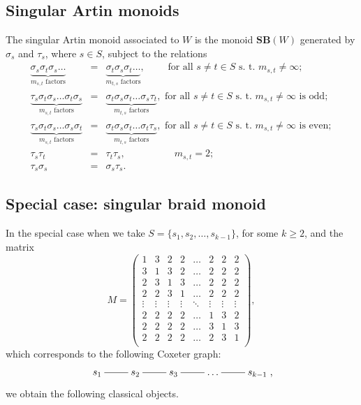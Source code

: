 \documentclass[a4paper]{amsart}
\begin{document}
\subsection{Singular Artin monoids}\label{s2.4}

The singular Artin monoid associated to $W$ is the
monoid $\mathbf{SB}(W)$ generated by $\sigma_s$ and $\tau_s$, where $s\in S$,  
subject to the relations
\begin{eqnarray}\label{sbm-eq1}
\underbrace{\sigma_s\sigma_t\sigma_s\dots}_{m_{s,t}\text{ factors}}
&=&\underbrace{\sigma_t\sigma_s\sigma_t\dots}_{m_{t,s}\text{ factors}},\qquad
\text{ for all }s\neq t\in S\text{ s. t. }m_{s,t}\neq \infty;\\
\label{sbm-eq2}
\underbrace{\tau_s\sigma_t\sigma_s\dots \sigma_t\sigma_s}_{m_{s,t}\text{ factors}}
&=&\underbrace{\sigma_t\sigma_s\sigma_t\dots\sigma_s\tau_t}_{m_{t,s}\text{ factors}},
\text{ for all }s\neq t\in S\text{ s. t. }m_{s,t}\neq \infty\text{ is odd};\\
\label{sbm-eq3}
\underbrace{\tau_s\sigma_t\sigma_s\dots \sigma_s\sigma_t}_{m_{s,t}\text{ factors}}
&=&\underbrace{\sigma_t\sigma_s\sigma_t\dots\sigma_t\tau_s}_{m_{t,s}\text{ factors}},
\text{ for all }s\neq t\in S\text{ s. t. }m_{s,t}\neq \infty\text{ is even};\\
\label{sbm-eq4}
\tau_s\tau_t&=&\tau_t\tau_s,\qquad\qquad\quad m_{s,t}=2;\\
\label{sbm-eq5}
\tau_s\sigma_s&=&\sigma_s\tau_s.
\end{eqnarray}

\subsection{Special case: singular braid monoid}\label{s2.5}

In the special case when we take $S=\{s_1,s_2,\dots,s_{k-1}\}$,  for some $k\geq 2$, 
and the matrix
\begin{displaymath}
M=\left(
\begin{array}{cccccccc}
1&3&2&2&\dots&2&2&2\\
3&1&3&2&\dots&2&2&2\\
2&3&1&3&\dots&2&2&2\\
2&2&3&1&\dots&2&2&2\\
\vdots&\vdots&\vdots&\vdots&\ddots&\vdots&\vdots&\vdots\\
2&2&2&2&\dots&1&3&2\\
2&2&2&2&\dots&3&1&3\\
2&2&2&2&\dots&2&3&1\\
\end{array}
\right),
\end{displaymath}
which corresponds to the following Coxeter graph:
\begin{equation}\label{eq1}
\xymatrix{s_1\ar@{-}[r]&s_2\ar@{-}[r]&s_3\ar@{-}[r]&\dots\ar@{-}[r]&s_{k-1}}, 
\end{equation}
we obtain the following classical objects.
\end{document}
